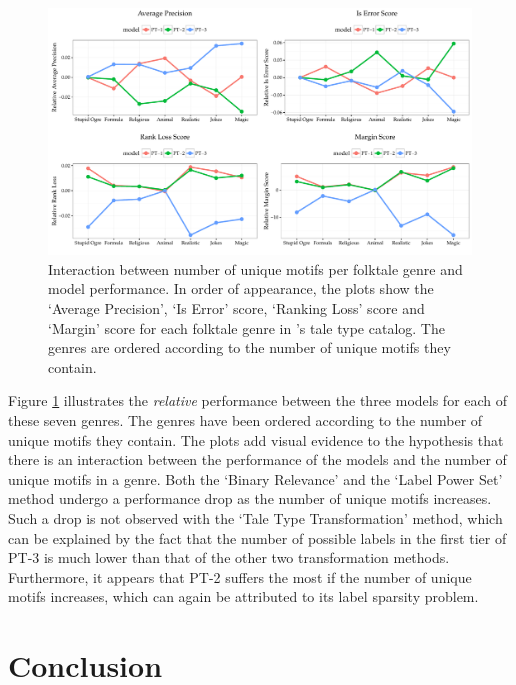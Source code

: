 \begin{figure}[t]
\centering
\includegraphics[width=\textwidth]{images/motif-evaluation-scores.pdf}
\caption{Interaction between number of unique motifs per folktale genre and model performance. In order of appearance, the plots show the `Average Precision', `Is Error' score, `Ranking Loss' score and `Margin' score for each folktale genre in \citeauthor{uther:2004}'s tale type catalog. The genres are ordered according to the number of unique motifs they contain.}
\label{fig:motif-classification-genre}
\end{figure}

Figure \ref{fig:motif-classification-genre} illustrates the \emph{relative} performance between the three models for each of these seven genres. The genres have been ordered according to the number of unique motifs they contain. The plots add visual evidence to the hypothesis that there is an interaction between the performance of the models and the number of unique motifs in a genre. Both the `Binary Relevance' and the `Label Power Set' method undergo a performance drop as the number of unique motifs increases. Such a drop is not observed with the `Tale Type Transformation' method, which can be explained by the fact that the number of possible labels in the first tier of PT-3 is much lower than that of the other two transformation methods. Furthermore, it appears that PT-2 suffers the most if the number of unique motifs increases, which can again be attributed to its label sparsity problem.

\section{Conclusion}

